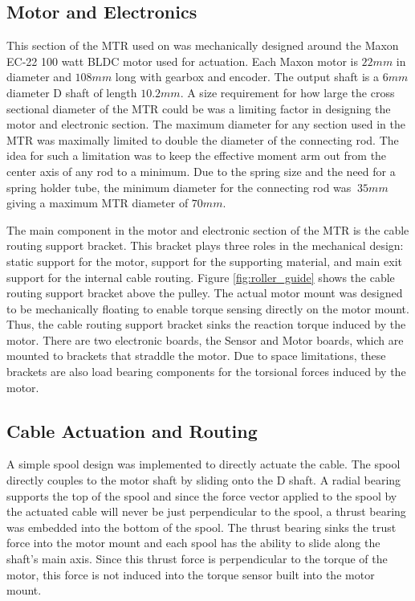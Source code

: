 \subsection{Motor and Electronics}
\label{mechanical:motor}
This section of the MTR used on \SB{} was mechanically designed around the Maxon EC-22 100 watt BLDC motor used for actuation. 
Each Maxon motor is \(22 mm\) in diameter and \(108 mm\) long with gearbox and encoder.
The output shaft is a \(6 mm\) diameter D shaft of length \(10.2 mm\).
A size requirement for how large the cross sectional diameter of the MTR could be was a limiting factor in designing the motor and electronic section.
The maximum diameter for any section used in the MTR was maximally limited to double the diameter of the connecting rod.
The idea for such a limitation was to keep the effective moment arm out from the center axis of any rod to a minimum.  
Due to the spring size and the need for a spring holder tube, the minimum diameter for the connecting rod was \(~35mm\) giving a maximum MTR diameter of \(70mm\).

The main component in the motor and electronic section of the MTR is the cable routing support bracket. 
This bracket plays three roles in the mechanical design: static support for the motor, support for the supporting material, and main exit support for the internal cable routing.
Figure \ref{fig:roller_guide} shows the cable routing support bracket above the pulley.
The actual motor mount was designed to be mechanically floating to enable torque sensing directly on the motor mount.
Thus, the cable routing support bracket sinks the reaction torque induced by the motor.
There are two electronic boards, the Sensor and Motor boards, which are mounted to brackets that straddle the motor.
Due to space limitations, these brackets are also load bearing components for the torsional forces induced by the motor.

\subsection{Cable Actuation and Routing}
\label{routing}
A simple spool design was implemented to directly actuate the cable. 
The spool directly couples to the motor shaft by sliding onto the D shaft.
A radial bearing supports the top of the spool and since the force vector applied to the spool by the actuated cable will never be just perpendicular to the spool, a thrust bearing was embedded into the bottom of the spool.
The thrust bearing sinks the trust force into the motor mount and each spool has the ability to slide along the shaft's main axis. 
Since this thrust force is perpendicular to the torque of the motor, this force is not induced into the torque sensor built into the motor mount.

